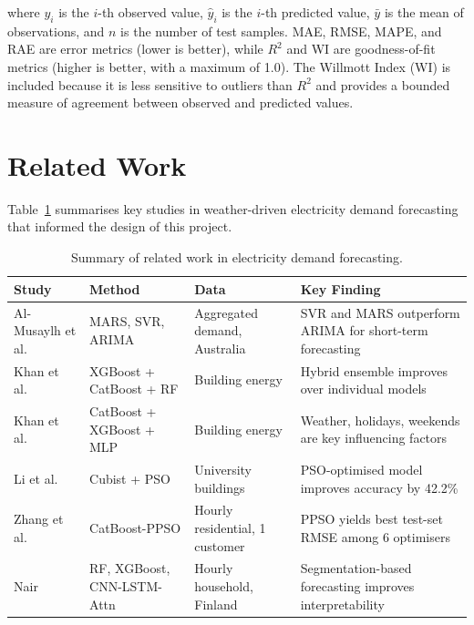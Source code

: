 where $y_i$ is the $i$-th observed value, $\hat{y}_i$ is the $i$-th predicted value, $\bar{y}$ is the mean of observations, and $n$ is the number of test samples. MAE, RMSE, MAPE, and RAE are error metrics (lower is better), while $R^2$ and WI are goodness-of-fit metrics (higher is better, with a maximum of 1.0). The Willmott Index (WI) \parencite{willmott1982validation} is included because it is less sensitive to outliers than $R^2$ and provides a bounded measure of agreement between observed and predicted values.


\section{Related Work}

Table~\ref{tab:related_work} summarises key studies in weather-driven electricity demand forecasting that informed the design of this project.

\begin{table}[H]
\centering
\caption{Summary of related work in electricity demand forecasting.}
\label{tab:related_work}
\small
\begin{tabular}{@{}p{2.8cm}p{2.5cm}p{3cm}p{3.5cm}@{}}
\toprule
\textbf{Study} & \textbf{Method} & \textbf{Data} & \textbf{Key Finding} \\
\midrule
Al-Musaylh et al.\ \parencite{almusaylh2018forecasting} & MARS, SVR, ARIMA & Aggregated demand, Australia & SVR and MARS outperform ARIMA for short-term forecasting \\
\addlinespace
Khan et al.\ \parencite{khan2020hybrid} & XGBoost + CatBoost + RF & Building energy & Hybrid ensemble improves over individual models \\
\addlinespace
Khan et al.\ \parencite{khan2021influencing} & CatBoost + XGBoost + MLP & Building energy & Weather, holidays, weekends are key influencing factors \\
\addlinespace
Li et al.\ \parencite{li2020datadrivenstrategy} & Cubist + PSO & University buildings & PSO-optimised model improves accuracy by 42.2\% \\
\addlinespace
Zhang et al.\ \parencite{zhang2023catboostppso} & CatBoost-PPSO & Hourly residential, 1 customer & PPSO yields best test-set RMSE among 6 optimisers \\
\addlinespace
Nair \parencite{nair2025predicting} & RF, XGBoost, CNN-LSTM-Attn & Hourly household, Finland & Segmentation-based forecasting improves interpretability \\
\bottomrule
\end{tabular}
\end{table}


